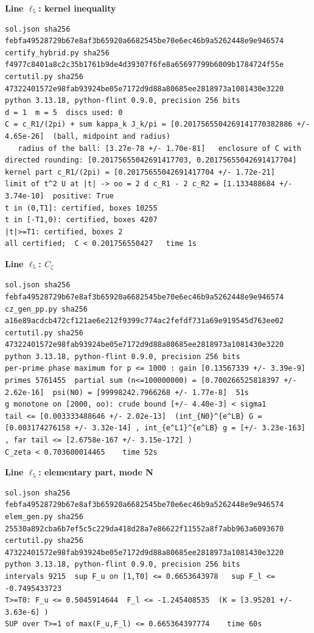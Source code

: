 \documentclass[11pt,reqno]{amsart}
\numberwithin{equation}{section}
\theoremstyle{definition}
\theoremstyle{remark}
\newcommand{\appsub}[1]{\par\medskip\noindent\textbf{#1}\par\nobreak\smallskip}
\begin{document}
\appsub{Line $\ell_{5}$: kernel inequality}
\begin{lstlisting}
sol.json sha256 febfa49528729b67e8af3b65920a6682545be70e6ec46b9a5262448e9e946574
certify_hybrid.py sha256 f4977c8401a8c2c35b1761b9de4d39307f6fe8a65697799b6009b1784724f55e
certutil.py sha256 47322401572e98fab93924be05e7172d9d88a80685ee2818973a1081430e3220
python 3.13.18, python-flint 0.9.0, precision 256 bits
d = 1  m = 5  discs used: 0 
C = c_R1/(2pi) + sum kappa_k J_k/pi = [0.2017565504269141770382886 +/- 4.65e-26]  (ball, midpoint and radius)
   radius of the ball: [3.27e-78 +/- 1.70e-81]   enclosure of C with directed rounding: [0.20175655042691417703, 0.20175655042691417704]
kernel part c_R1/(2pi) = [0.20175655042691417704 +/- 1.72e-21]
limit of t^2 U at |t| -> oo = 2 d c_R1 - 2 c_R2 = [1.133488684 +/- 3.74e-10]  positive: True
t in (0,T1]: certified, boxes 10255
t in [-T1,0): certified, boxes 4207
|t|>=T1: certified, boxes 2
all certified;  C < 0.201756550427   time 1s
\end{lstlisting}
\appsub{Line $\ell_{5}$: $C_\zeta$}
\begin{lstlisting}
sol.json sha256 febfa49528729b67e8af3b65920a6682545be70e6ec46b9a5262448e9e946574
cz_gen_pp.py sha256 a16e89acdcb472cf121ae6e212f9399c774ac2fefdf731a69e919545d763ee02
certutil.py sha256 47322401572e98fab93924be05e7172d9d88a80685ee2818973a1081430e3220
python 3.13.18, python-flint 0.9.0, precision 256 bits
per-prime phase maximum for p <= 1000 : gain [0.13567339 +/- 3.39e-9]
primes 5761455  partial sum (n<=100000000) = [0.700266525818397 +/- 2.62e-16]  psi(N0) = [99998242.7966268 +/- 1.77e-8]  51s
g monotone on [2000, oo): crude bound [+/- 4.40e-3] < sigma1
tail <= [0.003333488646 +/- 2.02e-13]  (int_{N0}^{e^LB} G = [0.003174276158 +/- 3.32e-14] , int_{e^L1}^{e^LB} g = [+/- 3.23e-163] , far tail <= [2.6758e-167 +/- 3.15e-172] )
C_zeta < 0.703600014465    time 52s
\end{lstlisting}
\appsub{Line $\ell_{5}$: elementary part, mode N}
\begin{lstlisting}
sol.json sha256 febfa49528729b67e8af3b65920a6682545be70e6ec46b9a5262448e9e946574
elem_gen.py sha256 25530a892cba6b7ef5c5c229da418d28a7e86622f11552a8f7abb963a6093670
certutil.py sha256 47322401572e98fab93924be05e7172d9d88a80685ee2818973a1081430e3220
python 3.13.18, python-flint 0.9.0, precision 256 bits
intervals 9215  sup F_u on [1,T0] <= 0.6653643978   sup F_l <= -0.7495433723
T>=T0: F_u <= 0.5045914644  F_l <= -1.245408535  (K = [3.95201 +/- 3.63e-6] )
SUP over T>=1 of max(F_u,F_l) <= 0.665364397774    time 60s
\end{lstlisting}
\end{document}
